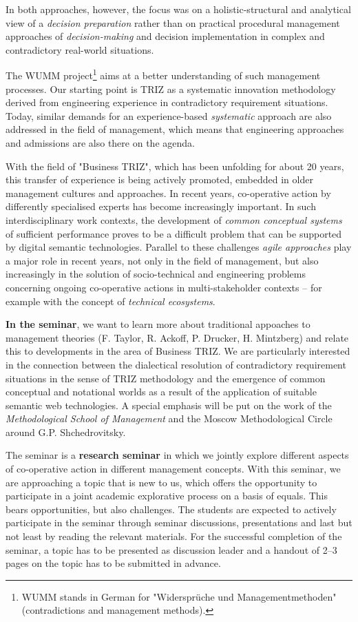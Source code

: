 \documentclass[11pt,a4paper]{article}
\begin{document}
In both approaches, however, the focus was on a holistic-structural and
analytical view of a \emph{decision preparation} rather than on practical
procedural management approaches of \emph{decision-making} and decision
implementation in complex and contradictory real-world situations.

The WUMM project\footnote{WUMM stands in German for "Widersprüche und
  Managementmethoden" (contradictions and management methods).} aims at a
better understanding of such management processes. Our starting point is TRIZ
as a systematic innovation methodology derived from engineering experience in
contradictory requirement situations. Today, similar demands for an
experience-based \emph{systematic} approach are also addressed in the field of
management, which means that engineering approaches and admissions are also
there on the agenda.

With the field of "Business TRIZ", which has been unfolding for about 20
years, this transfer of experience is being actively promoted, embedded in
older management cultures and approaches.  In recent years, co-operative
action by differently specialised experts has become increasingly important.
In such interdisciplinary work contexts, the development of \emph{common
  conceptual systems} of sufficient performance proves to be a difficult
problem that can be supported by digital semantic technologies.  Parallel to
these challenges \emph{agile approaches} play a major role in recent years,
not only in the field of management, but also increasingly in the solution of
socio-technical and engineering problems concerning ongoing co-operative
actions in multi-stakeholder contexts -- for example with the concept of
\emph{technical ecosystems}.

\textbf{In the seminar}, we want to learn more about traditional appoaches to
management theories (F. Taylor, R. Ackoff, P. Drucker, H. Mintzberg) and
relate this to developments in the area of Business TRIZ.  We are particularly
interested in the connection between the dialectical resolution of
contradictory requirement situations in the sense of TRIZ methodology and the
emergence of common conceptual and notational worlds as a result of the
application of suitable semantic web technologies.  A special emphasis will be
put on the work of the \emph{Methodological School of Management} and the
Moscow Methodological Circle around G.P. Shchedrovitsky. 

The seminar is a \textbf{research seminar} in which we jointly explore
different aspects of co-operative action in different management concepts.
With this seminar, we are approaching a topic that is new to us, which offers
the opportunity to participate in a joint academic explorative process on a
basis of equals. This bears opportunities, but also challenges.  The students
are expected to actively participate in the seminar through seminar
discussions, presentations and last but not least by reading the relevant
materials.  For the successful completion of the seminar, a topic has to be
presented as discussion leader and a handout of 2--3 pages on the topic has to
be submitted in advance.
\end{document}
